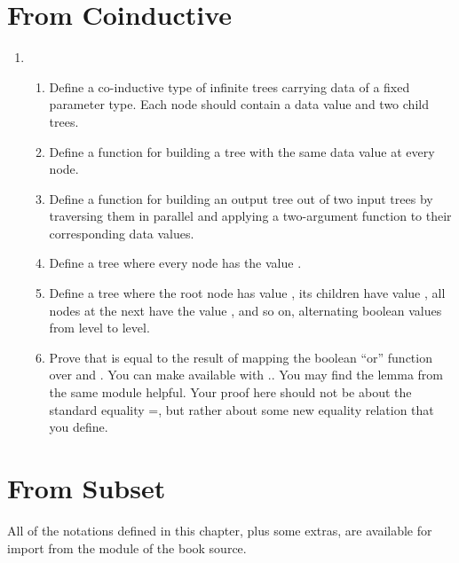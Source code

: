 \documentclass[12pt]{report}
\begin{document}
\section{From Coinductive}



 \begin{enumerate}


\item \begin{enumerate}
  \item Define a co-inductive type of infinite trees carrying data of a fixed parameter type.  Each node should contain a data value and two child trees.
  \item Define a function  for building a tree with the same data value at every node.
  \item Define a function  for building an output tree out of two input trees by traversing them in parallel and applying a two-argument function to their corresponding data values.
  \item Define a tree  where every node has the value .
  \item Define a tree  where the root node has value , its children have value , all nodes at the next have the value , and so on, alternating boolean values from level to level.
  \item Prove that  is equal to the result of mapping the boolean ``or'' function  over  and .  You can make  available with   ..  You may find the lemma  from the same module helpful.  Your proof here should not be about the standard equality =, but rather about some new equality relation that you define.
\end{enumerate} 


\end{enumerate} 

\section{From Subset}



 All of the notations defined in this chapter, plus some extras, are available for import from the module  of the book source.
\end{document}
